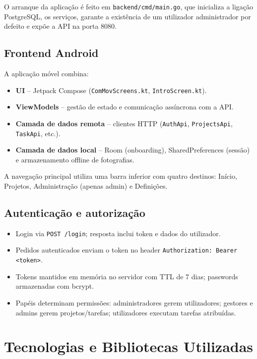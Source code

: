 \documentclass[12pt,a4paper]{article}
\begin{document}
O arranque da aplicação é feito em \texttt{backend/cmd/main.go}, que inicializa a ligação PostgreSQL, os serviços, garante a existência de um utilizador administrador por defeito e expõe a API na porta 8080.

\subsection{Frontend Android}

A aplicação móvel combina:

\begin{itemize}[leftmargin=*]
    \item \textbf{UI} -- Jetpack Compose (\texttt{ComMovScreens.kt}, \texttt{IntroScreen.kt}).
    \item \textbf{ViewModels} -- gestão de estado e comunicação assíncrona com a API.
    \item \textbf{Camada de dados remota} -- clientes HTTP (\texttt{AuthApi}, \texttt{ProjectsApi}, \texttt{TaskApi}, etc.).
    \item \textbf{Camada de dados local} -- Room (onboarding), SharedPreferences (sessão) e armazenamento offline de fotografias.
\end{itemize}

A navegação principal utiliza uma barra inferior com quatro destinos: Início, Projetos, Administração (apenas admin) e Definições.

\subsection{Autenticação e autorização}

\begin{itemize}[leftmargin=*]
    \item Login via \texttt{POST /login}; resposta inclui token e dados do utilizador.
    \item Pedidos autenticados enviam o token no header \texttt{Authorization: Bearer \textless token\textgreater}.
    \item Tokens mantidos em memória no servidor com TTL de 7 dias; passwords armazenadas com bcrypt.
    \item Papéis determinam permissões: administradores gerem utilizadores; gestores e admins gerem projetos/tarefas; utilizadores executam tarefas atribuídas.
\end{itemize}

\section{Tecnologias e Bibliotecas Utilizadas}
\end{document}
